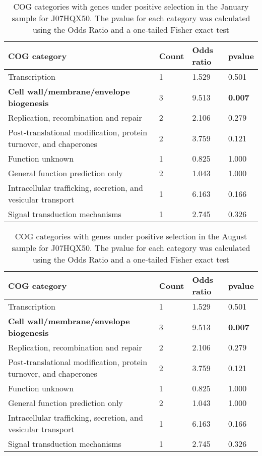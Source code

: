 \begin{table}[]
\footnotesize 
	\tabcolsep=0.11cm 
\caption{COG categories with genes under positive selection in the January sample for J07HQX50. The pvalue for each category was calculated using the Odds Ratio and a one-tailed Fisher exact test} 
\begin{tabularx}{\textwidth}{L{6cm}R{2cm}R{2cm}R{2cm}} 
\hline 
\textbf{COG category} & \textbf{Count} & \textbf{Odds ratio} & \textbf{pvalue} \\ 
\hline 
Transcription & 1 & 1.529 & 0.501 \\ 
\textbf{Cell wall/membrane/envelope biogenesis} & 3 & 9.513 & \textbf{0.007} \\ 
Replication, recombination and repair & 2 & 2.106 & 0.279 \\ 
Post-translational modification, protein turnover, and chaperones & 2 & 3.759 & 0.121 \\ 
Function unknown & 1 & 0.825 & 1.000 \\ 
General function prediction only & 2 & 1.043 & 1.000 \\ 
Intracellular trafficking, secretion, and vesicular transport & 1 & 6.163 & 0.166 \\ 
Signal transduction mechanisms & 1 & 2.745 & 0.326 \\ 
\end{tabularx} 
\label{January_COG_Selection_J07HQX50} 
 \end{table} 

\begin{table}[hb]
\footnotesize 
	\tabcolsep=0.11cm 
\caption{COG categories with genes under positive selection in the August sample for J07HQX50. The pvalue for each category was calculated using the Odds Ratio and a one-tailed Fisher exact test} 
\begin{tabularx}{\textwidth}{L{6cm}R{2cm}R{2cm}R{2cm}} 
\hline 
\textbf{COG category} & \textbf{Count} & \textbf{Odds ratio} & \textbf{pvalue} \\ 
\hline 
Transcription & 1 & 1.529 & 0.501 \\ 
\textbf{Cell wall/membrane/envelope biogenesis} & 3 & 9.513 & \textbf{0.007} \\ 
Replication, recombination and repair & 2 & 2.106 & 0.279 \\ 
Post-translational modification, protein turnover, and chaperones & 2 & 3.759 & 0.121 \\ 
Function unknown & 1 & 0.825 & 1.000 \\ 
General function prediction only & 2 & 1.043 & 1.000 \\ 
Intracellular trafficking, secretion, and vesicular transport & 1 & 6.163 & 0.166 \\ 
Signal transduction mechanisms & 1 & 2.745 & 0.326 \\ 
\end{tabularx} 
\label{August_COG_Selection_J07HQX50} 
 \end{table} 

